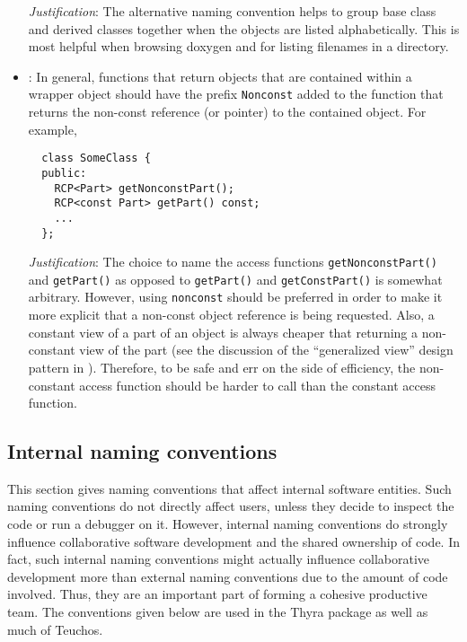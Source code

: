 \begin{itemize}
\textit{Justification}: The alternative naming convention helps to group base class and derived classes together when the objects are listed alphabetically.  This is most helpful when browsing doxygen and for listing filenames in a directory.  

\item\NCConstNonconstAccessFunctionName: In general, functions that
  return objects that are contained within a wrapper object should
  have the prefix \texttt{Nonconst} added to the function that returns
  the non-const reference (or pointer) to the contained object.  For
  example,

{\small\begin{verbatim}
  class SomeClass {
  public:
    RCP<Part> getNonconstPart();
    RCP<const Part> getPart() const;
    ...
  };
\end{verbatim}}

  \textit{Justification}: The choice to name the access functions
  \texttt{getNonconstPart()} and \texttt{getPart()} as opposed to
  \texttt{getPart()} and \texttt{getConstPart()} is somewhat
  arbitrary.  However, using \texttt{nonconst} should be preferred in
  order to make it more explicit that a non-const object reference is
  being requested.  Also, a constant view of a part of an object is
  always cheaper that returning a non-constant view of the part (see
  the discussion of the ``generalized view'' design pattern in
  {}\cite{TeuchosMemoryManagementGuide}).  Therefore, to be safe and
  err on the side of efficiency, the non-constant access function
  should be harder to call than the constant access function.

\end{itemize}


%
\subsection{Internal naming conventions}
\label{sec:InternalNamingConventions}

This section gives naming conventions that affect internal software
entities.  Such naming conventions do not directly affect users,
unless they decide to inspect the code or run a debugger on it.
However, internal naming conventions do strongly influence
collaborative software development and the shared ownership of code.
In fact, such internal naming conventions might actually influence
collaborative development more than external naming conventions due to
the amount of code involved.  Thus, they are an important part of
forming a cohesive productive team.  The conventions given below are
used in the Thyra package as well as much of Teuchos.


